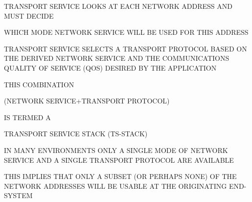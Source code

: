 \begin{bwslide}

\begin{nrtc}
\item	TRANSPORT SERVICE LOOKS AT EACH NETWORK ADDRESS AND MUST DECIDE
    \begin{nrtc}
    \item	WHICH MODE NETWORK SERVICE WILL BE USED FOR THIS ADDRESS
    \end{nrtc}

\item	TRANSPORT SERVICE SELECTS A TRANSPORT PROTOCOL BASED ON THE
	DERIVED NETWORK SERVICE AND THE COMMUNICATIONS QUALITY OF SERVICE (QOS)
	DESIRED BY THE APPLICATION

\item	THIS COMBINATION
    \begin{nrtc}
    \item	 (NETWORK SERVICE+TRANSPORT PROTOCOL)
    \end{nrtc}
	IS TERMED A
    \begin{nrtc}
    \item	TRANSPORT SERVICE STACK (TS-STACK)
    \end{nrtc}
\end{nrtc}
\end{bwslide}


\begin{bwslide}

\begin{nrtc}
\item	IN MANY ENVIRONMENTS ONLY A SINGLE MODE OF NETWORK SERVICE AND A
	SINGLE TRANSPORT PROTOCOL ARE AVAILABLE 

\item	THIS IMPLIES THAT ONLY A SUBSET (OR PERHAPS NONE) OF THE
	NETWORK ADDRESSES WILL BE USABLE AT THE ORIGINATING END-SYSTEM
\end{nrtc}
\end{bwslide}


